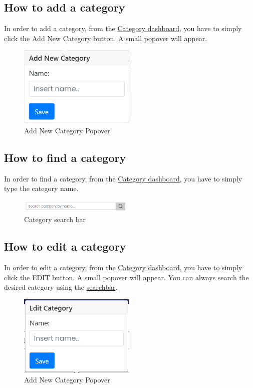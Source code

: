 \subsection{How to add a category}\label{_addCategory}
In order to add a category, from the \hyperref[_categorymanagement]{Category dashboard}, you have to simply click the Add New Category button.
A small popover will appear.
\begin{figure}[H]
    \centering
    \includegraphics[width=15em]{res/images/venditore/addcategorypopover.png}
    \caption{Add New Category Popover}
\end{figure}

\subsection{How to find a category}\label{_findCategory}
In order to find a category, from the \hyperref[_categorymanagement]{Category dashboard}, you have to simply type the category name.
\begin{figure}[H]
    \centering
    \includegraphics[width=15em]{res/images/venditore/categorysearchbar.png}
    \caption{Category search bar}
\end{figure}

\subsection{How to edit a category}\label{_editCategory}
In order to edit a category, from the \hyperref[_categorymanagement]{Category dashboard}, you have to simply click the EDIT button.
A small popover will appear.
You can always search the desired category using the \hyperref[_findCategory]{searchbar}.
\begin{figure}[H]
    \centering
    \includegraphics[width=15em]{res/images/venditore/editcategorypopover.png}
    \caption{Add New Category Popover}
\end{figure}

